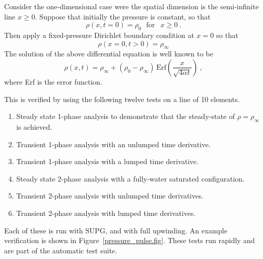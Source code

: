 \documentclass[]{scrreprt}
\begin{document}
Consider the one-dimensional case were the spatial dimension is the
semi-infinite line $x\geq 0$.  Suppose that initially the pressure is
constant, so that
\begin{equation}
\rho(x, t=0) = \rho_{0} \ \ \ \mbox{for }\ \ x\geq 0 \ .
\end{equation}
Then apply a fixed-pressure Dirichlet boundary condition at $x=0$ so
that
\begin{equation}
\rho(x=0, t>0) = \rho_{\infty}
\end{equation}
The solution of the above differential equation is well known to be
\begin{equation}
\rho(x, t) = \rho_{\infty} + (\rho_{0} -
\rho_{\infty})\,\mbox{Erf}\left( \frac{x}{\sqrt{4\alpha t}} \right) \ ,
\label{eqn.exact.pp}
\end{equation}
where Erf is the error function.

This is verified by using the following twelve tests on a line of
10 elements.
\begin{enumerate}
\item Steady state 1-phase analysis to demonstrate that the
  steady-state of $\rho = \rho_{\infty}$ is achieved.
\item Transient 1-phase analysis with an unlumped time derivative.
\item Transient 1-phase analysis with a lumped time derivative.
\item Steady state 2-phase analysis with a fully-water saturated configuration. 
\item Transient 2-phase analysis with unlumped time derivatives.
\item Transient 2-phase analysis with lumped time derivatives.
\end{enumerate}
Each of these is run with SUPG, and with full upwinding.
An example verification is shown in Figure~\ref{pressure_pulse.fig}.
These tests run rapidly and are part of the automatic test suite.
\end{document}
